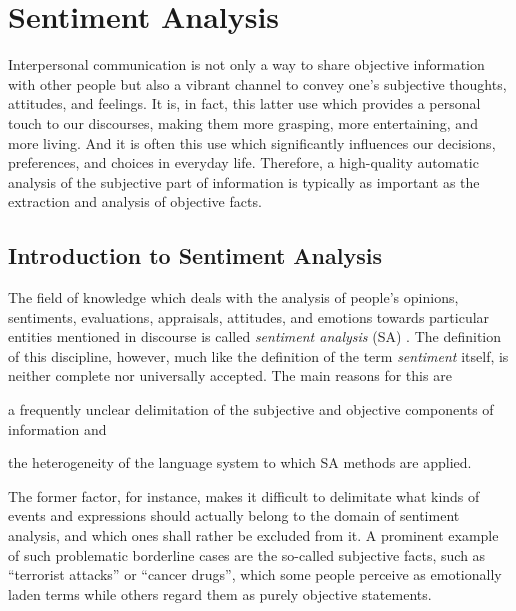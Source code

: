 

\part{Sentiment Analysis}

Interpersonal communication is not only a way to share objective
information with other people but also a vibrant channel to convey
one's subjective thoughts, attitudes, and feelings.  It is, in fact,
this latter use which provides a personal touch to our discourses,
making them more grasping, more entertaining, and more living.  And it
is often this use which significantly influences our decisions,
preferences, and choices in everyday life.  Therefore, a high-quality
automatic analysis of the subjective part of information is typically
as important as the extraction and analysis of objective facts.

\chapter{Introduction to Sentiment Analysis}

The field of knowledge which deals with the analysis of people's
opinions, sentiments, evaluations, appraisals, attitudes, and emotions
towards particular entities mentioned in discourse is called
\emph{sentiment analysis} (SA) \citep{Liu:12}.  The definition of this
discipline, however, much like the definition of the term
\emph{sentiment} itself, is neither complete nor universally accepted.
The main reasons for this are
\begin{inparaenum}
  \item a frequently unclear delimitation of the subjective and
    objective components of information and
  \item the heterogeneity of the language system to which SA methods
    are applied.
\end{inparaenum}

The former factor, for instance, makes it difficult to delimitate what
kinds of events and expressions should actually belong to the domain
of sentiment analysis, and which ones shall rather be excluded from
it.  A prominent example of such problematic borderline cases are the
so-called subjective facts, such as ``terrorist attacks'' or ``cancer
drugs'', which some people perceive as emotionally laden terms while
others regard them as purely objective statements.

